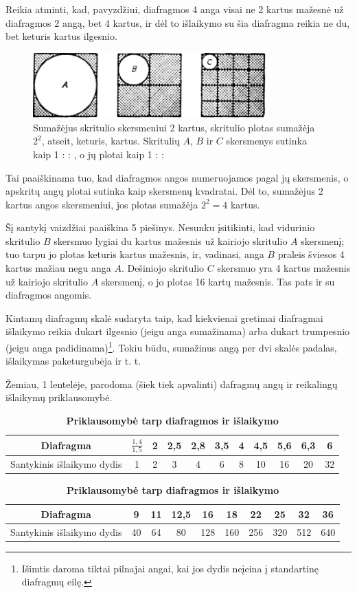 \documentclass{book}
\begin{document}
					Reikia atminti, kad, pavyzdžiui, diafragmos 4 anga visai ne 2 kartus mažesnė už diafragmos 2 angą, bet 4 kartus, ir dėl to išlaikymo su šia diafragma reikia ne du, bet keturis kartus ilgesnio.
					\begin{figure}[h]
						\centering
						\includegraphics[width=0.8\textwidth]{5-pav}
						\caption{Sumažėjus skritulio skersmeniui 2 kartus, skritulio plotas sumažėja $2^{2}$, atseit, keturis, kartus. Skritulių $A$, $B$ ir $C$ skersmenys sutinka kaip 1 :  : , o jų plotai kaip 1 :  : }
						\label{fig:5}
					\end{figure}
					Tai paaiškinama tuo, kad diafragmos angos numeruojamos pagal jų skersmenis, o apskritų angų plotai sutinka kaip skersmenų kvadratai. Dėl to, sumažėjus 2 kartus angos skersmeniui, jos plotas sumažėja $2^{2} = 4$ kartus.

					Šį santykį vaizdžiai paaiškina 5 piešinys. Nesunku įsitikinti, kad vidurinio skritulio $B$ skersmuo lygiai du kartus mažesnis už kairiojo skritulio $A$ skersmenį; tuo tarpu jo plotas keturis kartus mažesnis, ir, vadinasi, anga $B$ praleis šviesos 4 kartus mažiau negu anga $A$. Dešiniojo skritulio $C$ skersmuo yra 4 kartus mažesnis už kairiojo skritulio $A$ skersmenį, o jo plotas 16 kartų mažesnis. Tas pats ir su diafragmos angomis.

					Kintamų diafragmų skalė sudaryta taip, kad kiekvienai gretimai diafragmai išlaikymo reikia dukart ilgesnio (jeigu anga sumažinama) arba dukart trumpesnio (jeigu anga padidinama)\footnote{Išimtis daroma tiktai pilnajai angai, kai jos dydis neįeina į standartinę diafragmų eilę.}. Tokiu būdu, sumažinus angą per dvi skalės padalas, išlaikymas paketurgubėja ir t. t.

					Žemiau, 1 lentelėje, parodoma (šiek tiek apvalinti) dafragmų angų ir reikalingų išlaikymų priklausomybė.
					\begin{table}[h]
						\caption{\textbf{Priklausomybė tarp diafragmos ir išlaikymo}}
						\begin{tabular}{c|c|c|c|c|c|c|c|c|c|c|}
							\hline
							Diafragma & $\frac{1,4}{1,5}$ & 2 & 2,5 & 2,8 & 3,5 & 4 & 4,5 & 5,6 & 6,3 & 6 \\ \hline
							Santykinis išlaikymo dydis & 1 & 2 & 3 & 4 & 6 & 8 & 10 & 16 & 20 & 32 \\
							\hline
						\end{tabular}
						\begin{tabular}{c|c|c|c|c|c|c|c|c|c|}
							\hline
							Diafragma & 9 & 11 & 12,5 & 16 & 18 & 22 & 25 & 32 & 36 \\ \hline
							Santykinis išlaikymo dydis & 40 & 64 & 80 & 128 & 160 & 256 & 320 & 512 & 640 \\
							\hline
						\end{tabular}
					\end{table}
\end{document}
